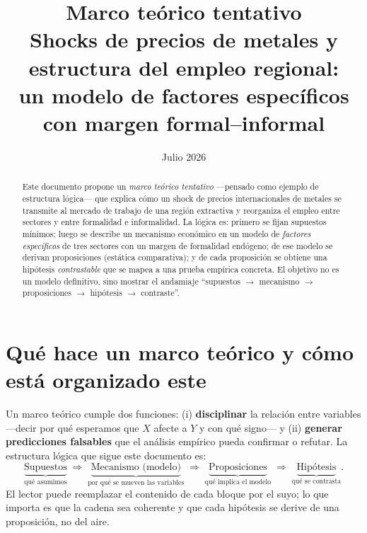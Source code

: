 \documentclass[11pt]{article}
\title{Marco teórico tentativo\\
\large Shocks de precios de metales y estructura del empleo regional:\\
un modelo de factores específicos con margen formal--informal}
\author{}
\date{Julio 2026}
\theoremstyle{definition}
\theoremstyle{plain}
\begin{document}
\maketitle

\begin{abstract}
\noindent Este documento propone un \emph{marco teórico tentativo} —pensado como ejemplo de
estructura lógica— que explica cómo un shock de precios internacionales de metales se transmite
al mercado de trabajo de una región extractiva y reorganiza el empleo entre sectores y entre
formalidad e informalidad. La lógica es: primero se fijan supuestos mínimos; luego se describe
un mecanismo económico en un modelo de \emph{factores específicos} de tres sectores con un
margen de formalidad endógeno; de ese modelo se derivan proposiciones (estática comparativa);
y de cada proposición se obtiene una hipótesis \emph{contrastable} que se mapea a una prueba
empírica concreta. El objetivo no es un modelo definitivo, sino mostrar el andamiaje
``supuestos $\to$ mecanismo $\to$ proposiciones $\to$ hipótesis $\to$ contraste''.
\end{abstract}

\tableofcontents

\section{Qué hace un marco teórico y cómo está organizado este}
Un marco teórico cumple dos funciones: (i) \textbf{disciplinar} la relación entre variables
—decir por qué esperamos que $X$ afecte a $Y$ y con qué signo— y (ii) \textbf{generar
predicciones falsables} que el análisis empírico pueda confirmar o refutar. La estructura
lógica que sigue este documento es:
\[
\underbrace{\text{Supuestos}}_{\text{qué asumimos}}
\;\Rightarrow\;
\underbrace{\text{Mecanismo (modelo)}}_{\text{por qué se mueven las variables}}
\;\Rightarrow\;
\underbrace{\text{Proposiciones}}_{\text{qué implica el modelo}}
\;\Rightarrow\;
\underbrace{\text{Hipótesis}}_{\text{qué se contrasta}}.
\]
El lector puede reemplazar el contenido de cada bloque por el suyo; lo que importa es que la
cadena sea coherente y que cada hipótesis se derive de una proposición, no del aire.
\end{document}
